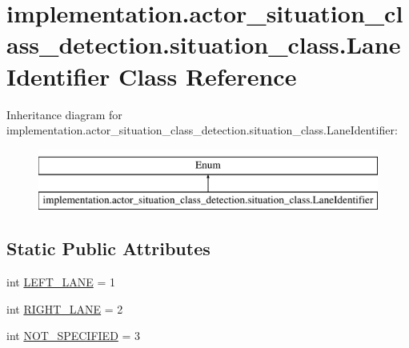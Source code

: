\hypertarget{classimplementation_1_1actor__situation__class__detection_1_1situation__class_1_1_lane_identifier}{}\section{implementation.\+actor\+\_\+situation\+\_\+class\+\_\+detection.\+situation\+\_\+class.\+Lane\+Identifier Class Reference}
\label{classimplementation_1_1actor__situation__class__detection_1_1situation__class_1_1_lane_identifier}
Inheritance diagram for implementation.\+actor\+\_\+situation\+\_\+class\+\_\+detection.\+situation\+\_\+class.\+Lane\+Identifier\+:\begin{figure}[H]
\begin{center}
\leavevmode
\includegraphics[height=2.000000cm]{classimplementation_1_1actor__situation__class__detection_1_1situation__class_1_1_lane_identifier}
\end{center}
\end{figure}
\subsection*{Static Public Attributes}
\begin{DoxyCompactItemize}
\item 
int \hyperlink{classimplementation_1_1actor__situation__class__detection_1_1situation__class_1_1_lane_identifier_afb2a2210286b5f946a42f3ed9432ae37}{L\+E\+F\+T\+\_\+\+L\+A\+NE} = 1
\item 
int \hyperlink{classimplementation_1_1actor__situation__class__detection_1_1situation__class_1_1_lane_identifier_a375985233368b3d3db7fe07f75e6225e}{R\+I\+G\+H\+T\+\_\+\+L\+A\+NE} = 2
\item 
int \hyperlink{classimplementation_1_1actor__situation__class__detection_1_1situation__class_1_1_lane_identifier_a5cea2450db27fc0da7a46789b5ac93a5}{N\+O\+T\+\_\+\+S\+P\+E\+C\+I\+F\+I\+ED} = 3
\end{DoxyCompactItemize}


